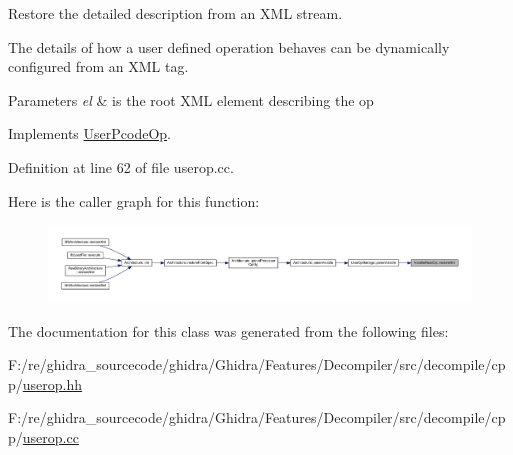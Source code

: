 Restore the detailed description from an X\+ML stream. 

The details of how a user defined operation behaves can be dynamically configured from an X\+ML tag. 
\begin{DoxyParams}{Parameters}
{\em el} & is the root X\+ML element describing the op \\
\hline
\end{DoxyParams}


Implements \mbox{\hyperlink{class_user_pcode_op_a2a7b7c637369bc4fba4604cd83a937af}{User\+Pcode\+Op}}.



Definition at line 62 of file userop.\+cc.

Here is the caller graph for this function\+:
\nopagebreak
\begin{figure}[H]
\begin{center}
\leavevmode
\includegraphics[width=350pt]{class_volatile_read_op_abdb0f4262d311abca0c8a3fe07ed758e_icgraph}
\end{center}
\end{figure}


The documentation for this class was generated from the following files\+:\begin{DoxyCompactItemize}
\item 
F\+:/re/ghidra\+\_\+sourcecode/ghidra/\+Ghidra/\+Features/\+Decompiler/src/decompile/cpp/\mbox{\hyperlink{userop_8hh}{userop.\+hh}}\item 
F\+:/re/ghidra\+\_\+sourcecode/ghidra/\+Ghidra/\+Features/\+Decompiler/src/decompile/cpp/\mbox{\hyperlink{userop_8cc}{userop.\+cc}}\end{DoxyCompactItemize}
